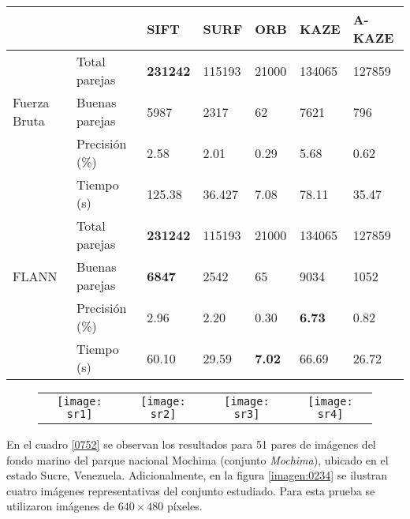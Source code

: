 \begin{table}[h]
	\centering
	\label{SR-2}
	\renewcommand{\arraystretch}{0.8}%
	\begin{tabular}{@{}lllllll@{}}
		\toprule
		&              	 			& SIFT 			 & SURF & ORB & KAZE  & A-KAZE \\ \midrule 
		\hfill\vline& Total parejas  &\textbf{231242}&115193&21000&134065 & 127859  \\
		Fuerza Bruta \vline& Buenas parejas & 5987 	& 2317 & 62  & 7621 & 796    \\
		\hfill\vline& Precisión (\%) & 2.58			&2.01  &0.29 &5.68& 0.62  \\
		\vspace{0.3cm}
		\hfill\vline& Tiempo (s)     & 125.38& 36.427& 7.08 &78.11 & 35.47 \\
		
		\hfill\vline& Total parejas  		&\textbf{231242}		&115193 &21000	&134065 		& 127859  \\
		FLANN  \hfill\vline& Buenas parejas &\textbf{6847}  		& 2542  & 65  	& 9034 			&1052     \\ 
		\hfill\vline& Precisión (\%) 		& 2.96					&2.20   &0.30	& \textbf{6.73} & 0.82  \\
		\hfill\vline& Tiempo (s)     		& 60.10					&29.59 & \textbf{7.02}	& 66.69			& 26.72  \\ 
		\bottomrule
	\end{tabular}
\end{table}
	 
\begin{figure}[h]
 	\centering
 	\vspace{0.6cm}
 	\begin{tabular}{@{}cccc@{}}
 		\texttt{[image: sr1]} &
 		\texttt{[image: sr2]} &
 		\texttt{[image: sr3]} &
 		\texttt{[image: sr4]} 
 	\end{tabular}
 	
 	\label{imagen:SR}
 	
\end{figure}

En el cuadro \ref{0752} se observan los resultados para 51 pares de imágenes del fondo marino del parque nacional Mochima (conjunto \textit{Mochima}), ubicado en el estado Sucre, Venezuela. Adicionalmente, en la figura \ref{imagen:0234} se ilustran cuatro imágenes representativas del conjunto estudiado. Para esta prueba se utilizaron imágenes de $640\times480$ píxeles.

